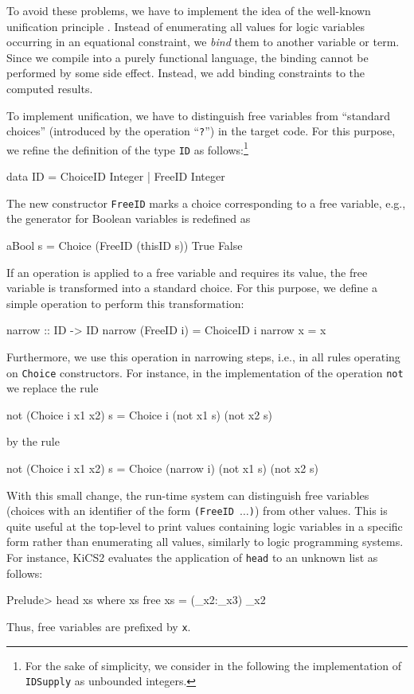 \documentclass{llncs}
\newcommand{\code}[1]{\mbox{\small\texttt{#1}}}
\newcommand{\ccode}[1]{``\code{#1}''}
\newcommand{\us}{\char95\xspace} %
\begin{document}
To avoid these problems, we have to implement the idea
of the well-known unification principle \cite{Robinson65}.
Instead of enumerating all values for logic variables
occurring in an equational constraint,
we \emph{bind} them to another variable or term.
Since we compile into a purely functional language,
the binding cannot be performed by some side effect.
Instead, we add binding constraints to the computed results.

To implement unification, we have to distinguish free variables
from ``standard choices'' (introduced by the operation \ccode{?})
in the target code. For this purpose, we refine the definition
of the type \code{ID} as follows:\footnote{For the sake
of simplicity, we consider in the following the
implementation of \code{IDSupply} as unbounded integers.}
\begin{haskell}
  data ID = ChoiceID Integer | FreeID Integer
\end{haskell}
The new constructor \code{FreeID} marks a choice corresponding to
a free variable, e.g., the generator for Boolean variables is
redefined as
\begin{haskell}
  aBool s = Choice (FreeID (thisID s)) True False
\end{haskell}
%
If an operation is applied to a free variable and requires its value,
the free variable is transformed into a standard choice.
For this purpose, we define a simple operation to perform
this transformation:
\begin{haskell}
  narrow :: ID -> ID
  narrow (FreeID i) = ChoiceID i
  narrow x          = x
\end{haskell}
Furthermore, we use this operation in narrowing steps,
i.e., in all rules operating on \code{Choice} constructors.
For instance, in the implementation of the operation \code{not}
we replace the rule
\begin{haskell}
  not (Choice i x1 x2) s = Choice i (not x1 s) (not x2 s)
\end{haskell}
by the rule
\begin{haskell}
  not (Choice i x1 x2) s = Choice (narrow i) (not x1 s) (not x2 s)
\end{haskell}
With this small change, the run-time system can distinguish
free variables (choices with an identifier of the form \code{(FreeID $\ldots$)})
from other values. This is quite useful at the top-level
to print values containing logic variables in a specific form
rather than enumerating all values, similarly to logic programming systems.
For instance, KiCS2 evaluates the application of \code{head}
to an unknown list as follows:
\begin{haskell}
  Prelude> head xs where xs free
  {xs = (_x2:_x3)} _x2
\end{haskell}
Thus, free variables are prefixed by \code{\us{}x}.
\end{document}
